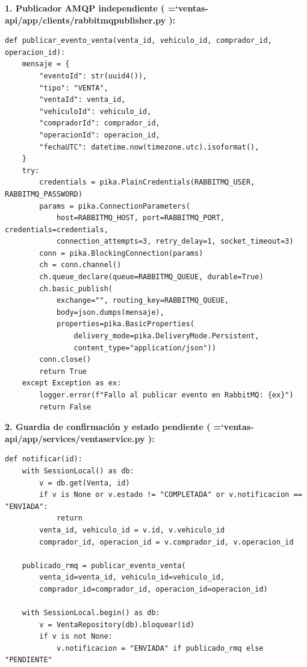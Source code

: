 \documentclass[11pt,a4paper]{article}
\renewcommand{\_}{\oldunderscore\allowbreak}
\DeclareRobustCommand{\texttt}[1]{%
  {\upshape\ttfamily\fontsize{9}{10.8}\selectfont\hyphenchar\font=`\-\relax #1}%
}
\begin{document}
\vspace{0.1cm}
\noindent\textbf{1. Publicador AMQP independiente (\texttt{ventas-api/\allowbreak{}app/\allowbreak{}clients/\allowbreak{}rabbitmq\_publisher.\allowbreak{}py}):}
\begin{lstlisting}
def publicar_evento_venta(venta_id, vehiculo_id, comprador_id, operacion_id):
    mensaje = {
        "eventoId": str(uuid4()),
        "tipo": "VENTA",
        "ventaId": venta_id,
        "vehiculoId": vehiculo_id,
        "compradorId": comprador_id,
        "operacionId": operacion_id,
        "fechaUTC": datetime.now(timezone.utc).isoformat(),
    }
    try:
        credentials = pika.PlainCredentials(RABBITMQ_USER, RABBITMQ_PASSWORD)
        params = pika.ConnectionParameters(
            host=RABBITMQ_HOST, port=RABBITMQ_PORT, credentials=credentials,
            connection_attempts=3, retry_delay=1, socket_timeout=3)
        conn = pika.BlockingConnection(params)
        ch = conn.channel()
        ch.queue_declare(queue=RABBITMQ_QUEUE, durable=True)
        ch.basic_publish(
            exchange="", routing_key=RABBITMQ_QUEUE,
            body=json.dumps(mensaje),
            properties=pika.BasicProperties(
                delivery_mode=pika.DeliveryMode.Persistent,
                content_type="application/json"))
        conn.close()
        return True
    except Exception as ex:
        logger.error(f"Fallo al publicar evento en RabbitMQ: {ex}")
        return False
\end{lstlisting}

\vspace{0.1cm}
\noindent\textbf{2. Guardia de confirmación y estado pendiente (\texttt{ventas-api/\allowbreak{}app/\allowbreak{}services/\allowbreak{}venta\_service.\allowbreak{}py}):}
\begin{lstlisting}
def notificar(id):
    with SessionLocal() as db:
        v = db.get(Venta, id)
        if v is None or v.estado != "COMPLETADA" or v.notificacion == "ENVIADA":
            return
        venta_id, vehiculo_id = v.id, v.vehiculo_id
        comprador_id, operacion_id = v.comprador_id, v.operacion_id

    publicado_rmq = publicar_evento_venta(
        venta_id=venta_id, vehiculo_id=vehiculo_id,
        comprador_id=comprador_id, operacion_id=operacion_id)

    with SessionLocal.begin() as db:
        v = VentaRepository(db).bloquear(id)
        if v is not None:
            v.notificacion = "ENVIADA" if publicado_rmq else "PENDIENTE"
\end{lstlisting}
\end{document}

